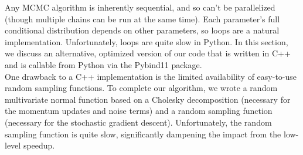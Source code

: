 Any MCMC algorithm is inherently sequential, and so can't be parallelized (though multiple chains can be run at the same time). Each parameter's full conditional distribution depends on other parameters, so loops are a natural implementation. Unfortunately, loops are quite slow in Python. In this section, we discuss an alternative, optimized version of our code that is written in C++ and is callable from Python via the Pybind11 package.\\

One drawback to a C++ implementation is the limited availability of easy-to-use random sampling functions. To complete our algorithm, we wrote a random multivariate normal function based on a Cholesky decomposition (necessary for the momentum updates and noise terms) and a random sampling function (necessary for the stochastic gradient descent). Unfortunately, the random sampling function is quite slow, significantly dampening the impact from the low-level speedup.